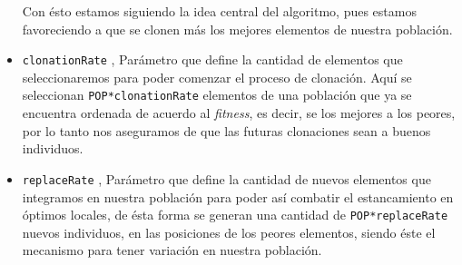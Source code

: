 \begin{itemize}
            Con ésto estamos siguiendo la idea central del algoritmo, pues estamos favoreciendo a que se clonen más
            los mejores elementos de nuestra población.

	\item \texttt{clonationRate}   \blue{[0,1]}, Parámetro que define la cantidad de elementos que seleccionaremos
			para poder comenzar el proceso de clonación. Aquí se seleccionan \texttt{POP*clonationRate} elementos
			de una población que ya se encuentra ordenada de acuerdo al \emph{fitness}, es decir, se los mejores
			a los peores, por lo tanto nos aseguramos de que las futuras clonaciones sean a buenos individuos.

	\item \texttt{replaceRate}     \blue{[0,1]}, Parámetro que define la cantidad de nuevos elementos que
			integramos en nuestra población para poder así combatir el estancamiento en óptimos locales,
			de ésta forma se generan una cantidad de \texttt{POP*replaceRate} nuevos individuos, en las posiciones
			de los peores elementos, siendo éste el mecanismo para tener variación en nuestra población.

\end{itemize}
